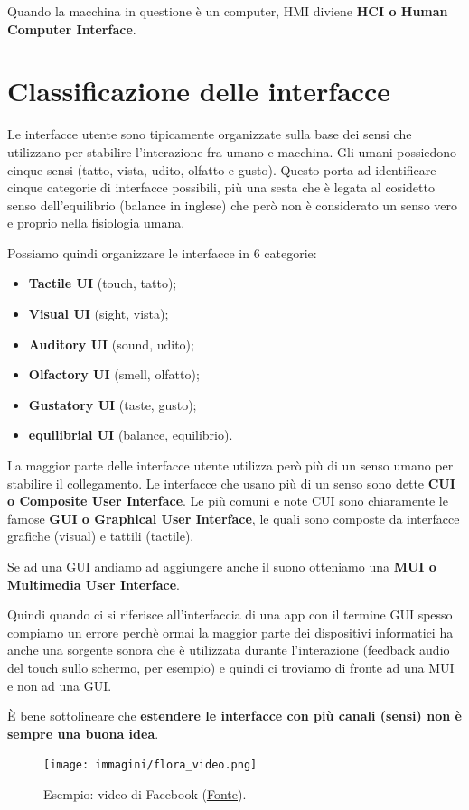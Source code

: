Quando la macchina in questione è un computer, HMI diviene \textbf{HCI o Human Computer Interface}.

\section{Classificazione delle interfacce}
Le interfacce utente sono tipicamente organizzate sulla base dei sensi che utilizzano per stabilire l'interazione fra umano e macchina. Gli umani
possiedono cinque sensi (tatto, vista, udito, olfatto e gusto). Questo porta ad identificare cinque categorie di interfacce possibili, più una sesta
che è legata al cosidetto senso dell'equilibrio (balance in inglese) che però non è considerato un senso vero e proprio nella fisiologia umana.

Possiamo quindi organizzare le interfacce in 6 categorie:
\begin{itemize}
	\itemsep-0.3em
	\item \textbf{Tactile UI} (touch, tatto);
	\item \textbf{Visual UI} (sight, vista);
	\item \textbf{Auditory UI} (sound, udito);
	\item \textbf{Olfactory UI} (smell, olfatto);
	\item \textbf{Gustatory UI} (taste, gusto);
	\item \textbf{equilibrial UI} (balance, equilibrio).
\end{itemize}

La maggior parte delle interfacce utente utilizza però più di un senso umano per stabilire il collegamento. Le interfacce che usano più di un senso
sono dette \textbf{CUI o Composite User Interface}. Le più comuni e note CUI sono chiaramente le famose \textbf{GUI o Graphical User Interface},
le quali sono composte da interfacce grafiche (visual) e tattili (tactile). 

Se ad una GUI andiamo ad aggiungere anche il suono otteniamo una \textbf{MUI o Multimedia User Interface}.

Quindi quando ci si riferisce all'interfaccia di una app con il termine GUI spesso compiamo un errore perchè ormai la maggior parte dei dispositivi
informatici ha anche una sorgente sonora che è utilizzata durante l'interazione (feedback audio del touch sullo schermo, per esempio) e quindi ci
troviamo di fronte ad una MUI e non ad una GUI.


È bene sottolineare che \textbf{estendere le interfacce con più canali (sensi) non è sempre una buona idea}.
\begin{figure}[!h]
	\centering
	\texttt{[image: immagini/flora\_video.png]}
	\caption{Esempio: video di Facebook (\href{https://www.facebook.com/Lastknight/posts/10158944882367053}{\underline{Fonte}}).}
\end{figure}

